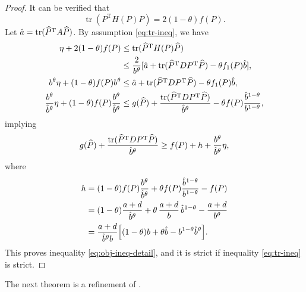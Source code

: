 \documentclass[11pt]{article}
\def\what{\widehat}
\DeclareMathOperator{\tr}{tr}
\DeclareMathOperator{\T}{T}
\theoremstyle{definition}
\numberwithin{equation}{section}
\begin{document}
\begin{proof}
It can be verified that
$$
\tr ( P^{\T} H(P) P)
            =2(1-\theta)f(P).
$$
Let $\hat\newalpha=\tr (\what P^{\T}A\what P)$.
By assumption \eqref{eq:tr-ineq}, we have
\begin{align}
\eta+2(1-\theta)f(P)&\le\tr(\what P^{\T} H(P)\what P) \nonumber\\
   &\le \frac 2{\newbeta^{\theta}}[\hat\newalpha+\tr(\what P^{\T} DP^{\T}\what P)-\theta f_1(P)\hat\newbeta],\nonumber \\
\newbeta^{\theta}\eta+(1-\theta)f(P)\newbeta^{\theta}
   &\le\hat\newalpha+\tr(\what P^{\T} DP^{\T}\what P)-\theta f_1(P)\hat\newbeta,\nonumber \\
\frac {\newbeta^{\theta}}{\hat\newbeta^{\theta}}\eta+(1-\theta)f(P)\frac {\newbeta^{\theta}}{\hat\newbeta^{\theta}}
   &\le g(\what P)
       +\frac {\tr(\what P^{\T} DP^{\T}\what P)}{\hat\newbeta^{\theta}}-\theta  f(P)\frac {\hat\newbeta^{1-\theta}}{\newbeta^{1-\theta}}, \nonumber%
\end{align}
implying
$$
g(\what P)+\frac {\tr(\what P^{\T} DP^{\T}\what P)}{\hat\newbeta^{\theta}}
  \ge f( P)+\newgamma+\frac {\newbeta^{\theta}}{\hat\newbeta^{\theta}}\eta,
$$
where
\begin{align}
h&=(1-\theta)f(P)\frac {b^{\theta}}{\hat{b}^{\theta}}
           +\theta  f(P)\frac {\hat{b}^{1-\theta}}{b^{1-\theta}}-f(P) \nonumber \\
  &=(1-\theta)\frac {a+d}{\hat{b}^{\theta}}
           +\theta\, \frac {a+d}{b}\,\hat{b}^{1-\theta}-\frac {a+d}{b^{\theta}} \nonumber \\
  &=\frac {a+d}{\hat{b}^{\theta}b}
    \Big[(1-\theta)b+\theta\hat{b}-b^{1-\theta}\hat{b}^{\theta}\Big]. \nonumber
\end{align}
This proves  inequality  \eqref{eq:obj-ineq-detail}, and it is strict if inequality \eqref{eq:tr-ineq} is strict.
\end{proof}

The next theorem
is a refinement of \cite[Theorem 2.2]{wazl:2023}.
\end{document}
